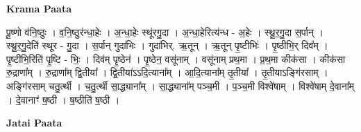 \documentclass[17pt]{extarticle}
\begin{document}
\textbf{Krama Paata} \newline

पू॒ष्णो व॑नि॒ष्ठुः । व॒नि॒ष्ठुर॑न्धा॒हेः । अ॒न्धा॒हेः स्थू॑रगु॒दा । अ॒न्धा॒हेरित्य॑न्ध - अ॒हेः । स्थू॒र॒गु॒दा स॒र्पान् । स्थू॒र॒गु॒देति॑ स्थूर - गु॒दा । स॒र्पान् गुदा॑भिः । गुदा॑भिर्. ऋ॒तून् । ऋ॒तून् पृ॒ष्टीभिः॑ । पृ॒ष्ठीभि॒र् दिव᳚म् । पृ॒ष्टीभि॒रिति॑ पृ॒ष्टि - भिः॒ । दिव॑म् पृ॒ष्ठेन॑ । पृ॒ष्ठेन॒ वसू॑नाम् । वसू॑नाम् प्रथ॒मा । प्र॒थ॒मा कीक॑सा । कीक॑सा रु॒द्राणा᳚म् । रु॒द्राणा᳚म् द्वि॒तीया᳚ । द्वि॒तीया॑ऽऽदि॒त्याना᳚म् । आ॒दि॒त्याना᳚म् तृ॒तीया᳚ । तृ॒तीयाऽङ्गि॑रसाम् । अङ्गि॑रसाम् चतु॒र्त्थी । च॒तु॒र्त्थी सा॒द्ध्याना᳚म् । सा॒द्ध्याना᳚म् पञ्च॒मी । प॒ञ्च॒मी विश्वे॑षाम् । विश्वे॑षाम् दे॒वाना᳚म् । दे॒वानाꣳ॑ ष॒ष्ठी । ष॒ष्ठीति॑ ष॒ष्ठी । \newline

\textbf{Jatai Paata} \newline
\end{document}
